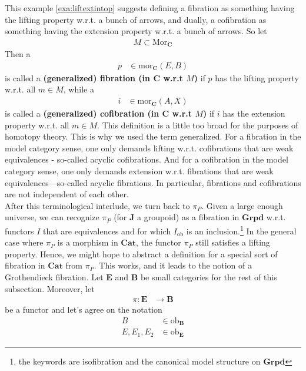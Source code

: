 This example \ref{exa:liftextintop} suggests defining a fibration as something having the lifting property w.r.t. a bunch of arrows, and dually, a cofibration as something having the extension property w.r.t. a bunch of arrows.
So let
\begin{align*}
  M
  \subset
  \mathrm{Mor}_{\mathbf{C}}
\end{align*}
Then a
\begin{align*}
  p
  &\in
  \mathrm{mor}_{\mathbf{C}}(E,B)
\end{align*}
is called a \textbf{(generalized) fibration (in $\mathbf{C}$ w.r.t $M$)} if $p$ has the lifting property w.r.t. all $m \in M$, while a
\begin{align*}
  i
  &\in
  \mathrm{mor}_{\mathbf{C}}(A,X)
\end{align*}
is called a \textbf{(generalized) cofibration (in $\mathbf{C}$ w.r.t $M$)} if $i$ has the extension property w.r.t. all $m \in M$.
This definition is a little too broad for the purposes of homotopy theory.
This is why we used the term {\glqq}generalized{\grqq}.
For a fibration in the model category sense, one only demands lifting w.r.t. cofibrations that are weak equivalences - so-called acyclic cofibrations.
And for a cofibration in the model category sense, one only demands extension w.r.t. fibrations that are weak equivalences—so-called acyclic fibrations.
In particular, fibrations and cofibrations are not independent of each other.
\\
After this terminological interlude, we turn back to $\pi_{P}$.
Given a large enough universe, we can recognize $\pi_{P}$ (for $\mathbf{J}$ a groupoid) as a fibration in $\mathbf{Grpd}$ w.r.t. functors $I$ that are equivalences and for which $I_{\textrm{ob}}$ is an inclusion.\footnote{the keywords are isofibration and the canonical model structure on $\mathbf{Grpd}$} In the general case where $\pi_{P}$ is a morphism in $\mathbf{Cat}$, the functor $\pi_{P}$ still satisfies a lifting property.
Hence, we might hope to abstract a definition for a special sort of fibration in $\mathbf{Cat}$ from $\pi_{P}$.
This works, and it leads to the notion of a Grothendieck fibration.
Let $\mathbf{E}$ and $\mathbf{B}$ be small categories for the rest of this subsection.
Moreover, let
\begin{align*}
  \pi
  \colon
  \mathbf{E}
  &\rightarrow
  \mathbf{B}
\end{align*}
be a functor and let's agree on the notation
\begin{align*}
  B
  &\in
  \mathrm{ob}_{\mathbf{B}}
  \\
  E,
  E_{1},
  E_{2}
  &\in
  \mathrm{ob}_{\mathbf{E}}
\end{align*}

